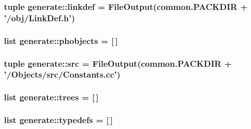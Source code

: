 \label{namespacegenerate_ac750e14543c2bb425f55a27c6f8f648b}
\hypertarget{namespacegenerate_a6a592a18c6fbaf7baf93f73691647e6d}{
\subsubsection[{linkdef}]{\setlength{\rightskip}{0pt plus 5cm}tuple {\bf generate::linkdef} = FileOutput(common.PACKDIR + '/obj/LinkDef.h')}}
\label{namespacegenerate_a6a592a18c6fbaf7baf93f73691647e6d}
\hypertarget{namespacegenerate_ad6f1689d89c49747c02aeab9ec1bcca1}{
\subsubsection[{phobjects}]{\setlength{\rightskip}{0pt plus 5cm}list {\bf generate::phobjects} = \mbox{[}$\,$\mbox{]}}}
\label{namespacegenerate_ad6f1689d89c49747c02aeab9ec1bcca1}
\hypertarget{namespacegenerate_a9b1edef2efe0773ac2184c462dfd73e9}{
\subsubsection[{src}]{\setlength{\rightskip}{0pt plus 5cm}tuple {\bf generate::src} = FileOutput(common.PACKDIR + '/Objects/{\bf src}/Constants.cc')}}
\label{namespacegenerate_a9b1edef2efe0773ac2184c462dfd73e9}
\hypertarget{namespacegenerate_a08379947b9a86e5ad264e317f190a270}{
\subsubsection[{trees}]{\setlength{\rightskip}{0pt plus 5cm}list {\bf generate::trees} = \mbox{[}$\,$\mbox{]}}}
\label{namespacegenerate_a08379947b9a86e5ad264e317f190a270}
\hypertarget{namespacegenerate_a56d0b1b4536d04b5dd7346c5459e16dd}{
\subsubsection[{typedefs}]{\setlength{\rightskip}{0pt plus 5cm}list {\bf generate::typedefs} = \mbox{[}$\,$\mbox{]}}}
\label{namespacegenerate_a56d0b1b4536d04b5dd7346c5459e16dd}
